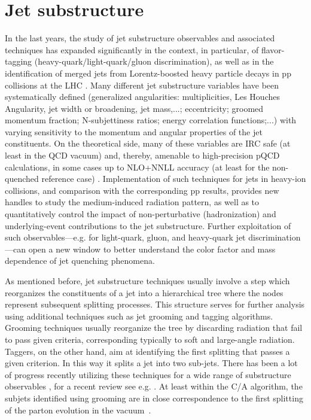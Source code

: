 
\section{Jet substructure}
\label{sec:jetsubstructure}

In the last years, the study of jet substructure observables and associated techniques has expanded significantly in the context, in particular, of flavor-tagging (heavy-quark/light-quark/gluon discrimination), as well as in the identification of merged jets from Lorentz-boosted heavy particle decays in pp collisions at the LHC \cite{Ellis:2009su,Altheimer:2013yza}. Many different jet substructure variables have been systematically defined (generalized angularities: multiplicities, Les Houches Angularity, jet width or broadening, jet mass,...; eccentricity; groomed momentum fraction; N-subjettiness ratios; energy correlation functions;...) with varying sensitivity to the momentum and angular properties of the jet constituents. On the theoretical side, many of these variables are IRC safe (at least in the QCD vacuum) and, thereby, amenable to high-precision pQCD calculations, in some cases up to NLO+NNLL accuracy (at least for the non-quenched reference case) \cite{Marzani:2017mva,Frye:2016aiz}. Implementation of such techniques for jets in heavy-ion collisions, and comparison with the corresponding pp results, provides new handles to study the medium-induced radiation pattern, as well as to quantitatively control the impact of non-perturbative (hadronization) and underlying-event contributions to the jet substructure. Further exploitation of such observables---e.g. for light-quark, gluon, and heavy-quark jet discrimination---can open a new window to better understand the color factor and mass dependence of
jet quenching phenomena.

As mentioned before, jet substructure techniques usually involve a step which reorganizes the constituents of a jet into a hierarchical tree where the nodes represent subsequent splitting processes.
This structure serves for further analysis using additional techniques such as jet grooming and tagging algorithms.
Grooming techniques usually reorganize the tree by discarding radiation that fail to pass given criteria, corresponding typically to soft and large-angle radiation. Taggers, on the other hand, aim at identifying the first splitting that passes a given criterion. In this way it splits a jet into two sub-jets. There has been a lot of progress recently utilizing these techniques for a wide range of substructure observables \cite{Butterworth:2008iy,Ellis:2009me,Krohn:2009th,Dasgupta:2013ihk,Larkoski:2014wba}, for a recent review see e.g. \cite{Larkoski:2017jix}. At least within the C/A algorithm, the subjets identified using grooming are in close correspondence to 
the first splitting of the parton evolution in the vacuum~\cite{Altarelli:1977zs,Larkoski:2015lea}.

